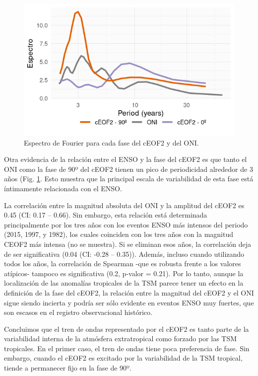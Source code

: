 \documentclass[12pt,oneside,a4paper]{reedthesis}
\begin{document}
\begin{figure}

{\centering \includegraphics{figures/20-ceofs/fft-ceof-era5-1} 

}

\caption{Espectro de Fourier para cada fase del cEOF2 y del ONI.}\label{fig:fft-ceof-era5}
\end{figure}



Otra evidencia de la relación entre el ENSO y la fase del cEOF2 es que tanto el ONI como la fase de 90º del cEOF2 tienen un pico de periodicidad alrededor de 3 años (Fig. \ref{fig:fft-ceof-era5}.
Esto muestra que la principal escala de variabilidad de esta fase está íntimamente relacionada con el ENSO.

La correlación entre la magnitud absoluta del ONI y la amplitud del cEOF2 es 0.45 (CI: 0.17 -- 0.66).
Sin embargo, esta relación está determinada principalmente por los tres años con los eventos ENSO más intensos del periodo (2015, 1997, y 1982), los cuales coinciden con los tres años con la magnitud CEOF2 más intensa (no se muestra).
Si se eliminan esos años, la correlación deja de ser significativa (0.04 (CI: -0.28 -- 0.35)).
Además, incluso cuando utilizando todos los años, la correlación de Spearman -que es robusta frente a los valores atípicos- tampoco es significativa (0.2, p-valor = 0.21).
Por lo tanto, aunque la localización de las anomalías tropicales de la TSM parece tener un efecto en la definición de la fase del cEOF2, la relación entre la magnitud del cEOF2 y el ONI sigue siendo incierta y podría ser sólo evidente en eventos ENSO muy fuertes, que son escasos en el registro observacional histórico.

Concluimos que el tren de ondas representado por el cEOF2 es tanto parte de la variabilidad interna de la atmósfera extratropical como forzado por las TSM tropicales.
En el primer caso, el tren de ondas tiene poca preferencia de fase.
Sin embargo, cuando el cEOF2 es excitado por la variabilidad de la TSM tropical, tiende a permanecer fijo en la fase de 90º.
\end{document}
